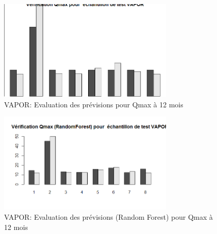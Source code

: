 \begin{figure}[H]
\centering
\includegraphics[width=0.75\textwidth]{../Fig/VAPOR/vapor-regtree-test-qmax12.png}
\caption{VAPOR: Evaluation des prévisions pour Qmax à 12 mois}
\label{fig-vapor-regtree-test-qmax12}
\end{figure}

\begin{figure}[H]
\centering
\includegraphics[width=0.75\textwidth]{../Fig/VAPOR/vapor-forest-test-qmax12.png}
\caption{VAPOR: Evaluation des prévisions (Random Forest) pour Qmax à 12 mois}
\label{fig-vapor-forest-test-qmax12}
\end{figure}

